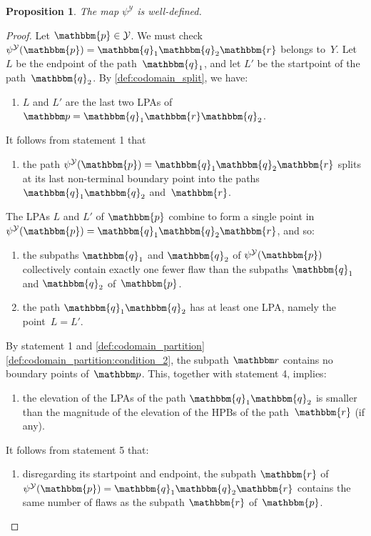 \documentclass[11pt]{article}
\newtheorem{prop}[thm]{Proposition}
\theoremstyle{definition} %
\numberwithin{equation}{section}
\begin{document}
\begin{prop}
The map $\psi^\mathcal Y$ is well-defined.
\label{rem:codomain_psi_Y}
\end{prop}
\begin{proof}
    Let $\mathbbm{p} \in \mathcal{Y}$.
    We must check  
    $\psi^\mathcal Y(\mathbbm{p}) = \mathbbm{q}_1 \mathbbm{q}_2 \mathbbm{r}$ belongs to~$Y$.
    Let $L$ be the endpoint of the path~$\mathbbm{q}_1$, and let $L'$ be the startpoint of the path~$\mathbbm{q}_2$.
    By \cref{def:codomain_split}, we have:

    \begin{enumerate}
    \item[1.]
    \label{rem:codomain_psi_Y:L_and_L'_are_LPAs}
    $L$ and $L'$ are the last two LPAs of~$\mathbbm p = \mathbbm{q}_1 \mathbbm{r} \mathbbm{q}_2$.
    \end{enumerate}

    It follows from statement 1 that
    \begin{enumerate}
    \item[2.]
    the path $\psi^{\mathcal Y}(\mathbbm{p}) = \mathbbm{q}_1 \mathbbm{q}_2 \mathbbm{r}$ splits at its last non-terminal boundary point into the paths $\mathbbm{q}_1 \mathbbm{q}_2$ and~$\mathbbm{r}$.
    \end{enumerate}
    
    The LPAs $L$ and $L'$ of $\mathbbm{p}$ combine to form a single point in $\psi^\mathcal Y(\mathbbm{p}) = \mathbbm{q}_1 \mathbbm{q}_2 \mathbbm{r}$, and so:
    
    \begin{enumerate}
    \item[3.]
    the subpaths $\mathbbm{q}_1$ and $\mathbbm{q}_2$ of $\psi^\mathcal Y(\mathbbm{p})$ collectively contain exactly one fewer flaw than the subpaths $\mathbbm{q}_1$ and $\mathbbm{q}_2$ of~$\mathbbm{p}$.
    
    \item[4.]
    the path $\mathbbm{q}_1 \mathbbm{q}_2$ has at least one LPA, namely the point~$L=L'$.
    \end{enumerate}

    By statement 1 and \cref{def:codomain_partition}\ref{def:codomain_partition:condition_2}, the subpath $\mathbbm r$ contains no boundary points of~$\mathbbm p$. This, together with statement 4, implies:

    \begin{enumerate}
    \item[5.]
    the elevation of the LPAs of the path $\mathbbm{q}_1 \mathbbm{q}_2$ is smaller than the magnitude of the elevation of the HPBs of the path~$\mathbbm{r}$ (if any).
    \end{enumerate}
    It follows from statement 5 that:
    \begin{enumerate}
    \item[6.]
    disregarding its startpoint and endpoint, the subpath $\mathbbm{r}$ of $\psi^\mathcal Y(\mathbbm{p}) = \mathbbm{q}_1 \mathbbm{q}_2 \mathbbm{r}$  contains the same number of flaws as the subpath $\mathbbm{r}$ of~$\mathbbm{p}$.
    \end{enumerate}
    

\end{proof}
\end{document}
